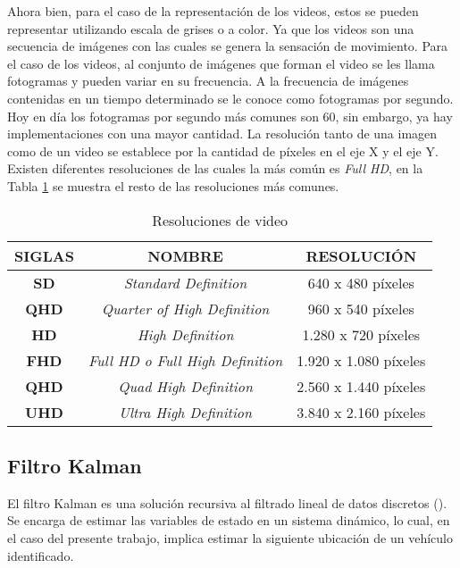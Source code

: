 Ahora bien, para el caso de la representación de los videos, estos se pueden representar utilizando escala de grises o a color. Ya que los videos son una secuencia de imágenes con las cuales se genera la sensación de movimiento. Para el caso de los videos, al conjunto de imágenes que forman el video se les llama fotogramas y pueden variar en su frecuencia. A la frecuencia de imágenes contenidas en un tiempo determinado se le conoce como fotogramas por segundo. Hoy en día los fotogramas por segundo más comunes son 60, sin embargo, ya hay implementaciones con una mayor cantidad.
La resolución tanto de una imagen como de un video se establece por la cantidad de píxeles en el eje X y el eje Y. Existen diferentes resoluciones de las cuales la más común es \textit{Full HD}, en la Tabla \ref{tab:resolutions} se muestra el resto de las resoluciones más comunes.

\begin{table}[H]
    \caption{Resoluciones de video}
    \centering
    \label{tab:resolutions}
    \begin{tabular}{|c|c|c|}
    \hline
    \textbf{SIGLAS} & \textbf{NOMBRE} & \textbf{RESOLUCIÓN} \\ \hline
    \textbf{SD}     & \textit{Standard Definition} & 640 x 480 píxeles \\ \hline
    \textbf{QHD}    & \textit{Quarter of High Definition} & 960 x 540 píxeles \\ \hline
    \textbf{HD}     & \textit{High Definition} & 1.280 x 720 píxeles \\ \hline
    \textbf{FHD}    & \textit{Full HD o Full High Definition} & 1.920 x 1.080 píxeles \\ \hline
    \textbf{QHD}    & \textit{Quad High Definition} & 2.560 x 1.440 píxeles \\ \hline
    \textbf{UHD}    & \textit{Ultra High Definition} & 3.840 x 2.160 píxeles \\ \hline
    \end{tabular}
\end{table}

\subsection{Filtro Kalman}

El filtro Kalman es una solución recursiva al filtrado lineal de datos discretos (\cite{welch1995introduction}). Se encarga de estimar las variables de estado en un sistema dinámico, lo cual, en el caso del presente trabajo, implica estimar la siguiente ubicación de un vehículo identificado.

